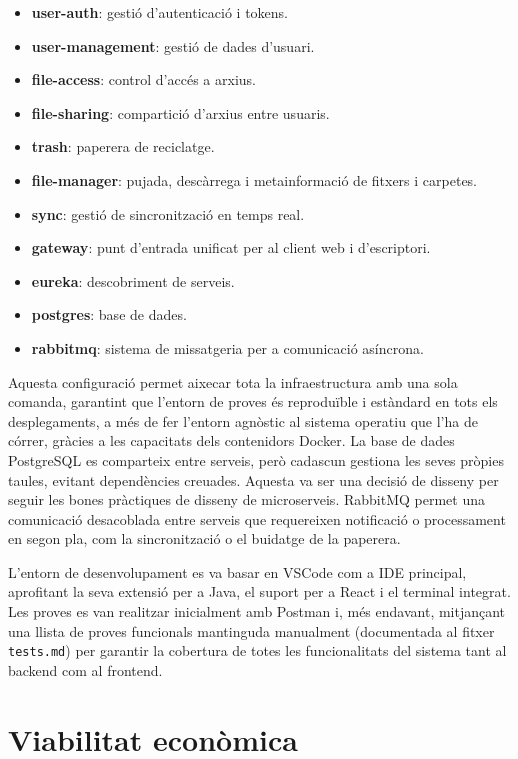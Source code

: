 \begin{itemize}
  \item \textbf{user-auth}: gesti\'o d'autenticaci\'o i tokens.
  \item \textbf{user-management}: gesti\'o de dades d'usuari.
  \item \textbf{file-access}: control d'acc\'es a arxius.
  \item \textbf{file-sharing}: compartici\'o d'arxius entre usuaris.
  \item \textbf{trash}: paperera de reciclatge.
  \item \textbf{file-manager}: pujada, desc\`arrega i metainformaci\'o de fitxers i carpetes.
  \item \textbf{sync}: gesti\'o de sincronitzaci\'o en temps real.
  \item \textbf{gateway}: punt d'entrada unificat per al client web i d'escriptori.
  \item \textbf{eureka}: descobriment de serveis.
  \item \textbf{postgres}: base de dades.
  \item \textbf{rabbitmq}: sistema de missatgeria per a comunicaci\'o as\'incrona.
\end{itemize}

Aquesta configuraci\'o permet aixecar tota la infraestructura amb una sola comanda, garantint que l'entorn de proves \'es reprodu\"ible i est\`andard en tots els desplegaments, a m\'es de fer l'entorn agn\`ostic al sistema operatiu que l'ha de c\'orrer, gr\`acies a les capacitats dels contenidors Docker. 
La base de dades PostgreSQL es comparteix entre serveis, per\`o cadascun gestiona les seves pr\`opies taules, evitant depend\`encies creuades. Aquesta va ser una decisi\'o de disseny per seguir les bones pr\`actiques de disseny de microserveis.
RabbitMQ permet una comunicaci\'o desacoblada entre serveis que requereixen notificaci\'o o processament en segon pla, com la sincronitzaci\'o o el buidatge de la paperera.

L'entorn de desenvolupament es va basar en VSCode com a IDE principal, aprofitant la seva extensió per a Java, el suport per a React i el terminal integrat. Les proves es van realitzar inicialment amb Postman i, més endavant, mitjançant una llista de proves funcionals mantinguda manualment (documentada al fitxer \texttt{tests.md}) per garantir la cobertura de totes les funcionalitats del sistema tant al backend com al frontend.

\section{Viabilitat econ\`omica}

